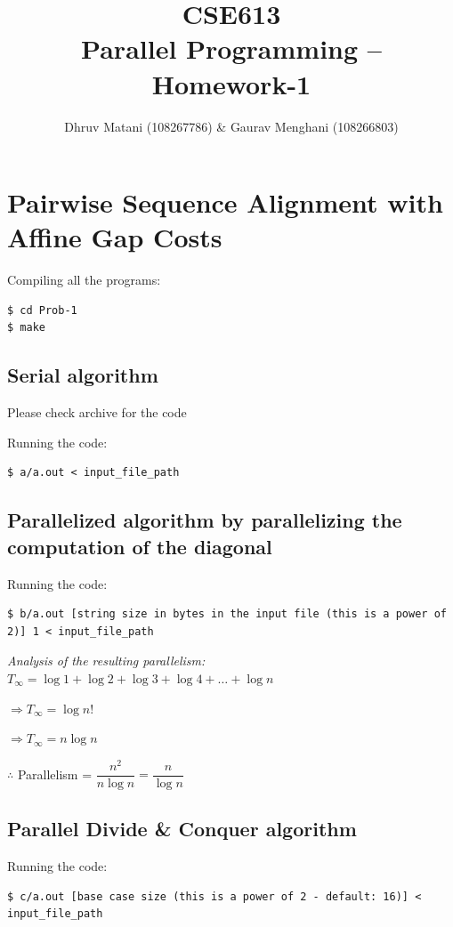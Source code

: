 \documentclass{article}
\title{CSE613\\Parallel Programming -- Homework-1}
\author{Dhruv Matani (108267786) \& Gaurav Menghani (108266803)}
\begin{document}
\maketitle

\clearpage

\tableofcontents

\clearpage

\section{Pairwise Sequence Alignment with Affine Gap Costs}

Compiling all the programs:
\begin{verbatim}
$ cd Prob-1
$ make
\end{verbatim}

\subsection{Serial algorithm}

Please check archive for the code

Running the code:
\begin{verbatim}
$ a/a.out < input_file_path
\end{verbatim}

\subsection{Parallelized algorithm by parallelizing the computation of the diagonal}

Running the code:
\begin{verbatim}
$ b/a.out [string size in bytes in the input file (this is a power of 2)] 1 < input_file_path
\end{verbatim}

\textit{Analysis of the resulting parallelism:} $T_{\infty} = \log{1} + \log{2} + \log{3} + \log{4} + \ldots{} + \log{n}$

$\Rightarrow T_{\infty} = \log{n!}$

$\Rightarrow T_{\infty} = n\log{n}$

$\therefore$ Parallelism = $\dfrac{n^2}{n\log{n}} = \dfrac{n}{\log{n}}$

\subsection{Parallel Divide \& Conquer algorithm}

Running the code:
\begin{verbatim}
$ c/a.out [base case size (this is a power of 2 - default: 16)] < input_file_path
\end{verbatim}
\end{document}
